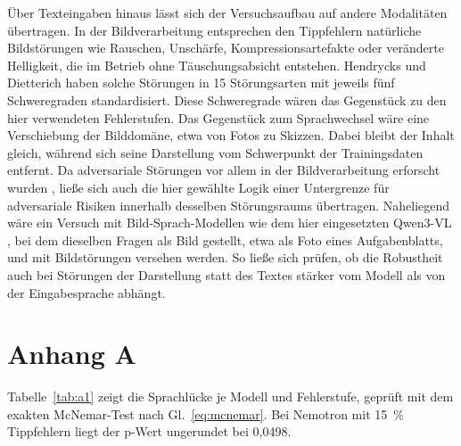 \documentclass[a4paper,titlepage]{article}
\numberwithin{equation}{section} %
\begin{document}
Über Texteingaben hinaus lässt sich der Versuchsaufbau auf andere Modalitäten übertragen. In der Bildverarbeitung entsprechen den Tippfehlern natürliche Bildstörungen wie Rauschen, Unschärfe, Kompressionsartefakte oder veränderte Helligkeit, die im Betrieb ohne Täuschungsabsicht entstehen. Hendrycks und Dietterich \citeyearpar{hendrycks_benchmarking_2019} haben solche Störungen in 15 Störungsarten mit jeweils fünf Schweregraden standardisiert. Diese Schweregrade wären das Gegenstück zu den hier verwendeten Fehlerstufen. Das Gegenstück zum Sprachwechsel wäre eine Verschiebung der Bilddomäne, etwa von Fotos zu Skizzen. Dabei bleibt der Inhalt gleich, während sich seine Darstellung vom Schwerpunkt der Trainingsdaten entfernt. Da adversariale Störungen vor allem in der Bildverarbeitung erforscht wurden \citep{goodfellow_explaining_2014}, ließe sich auch die hier gewählte Logik einer Untergrenze für adversariale Risiken innerhalb desselben Störungsraums übertragen. Naheliegend wäre ein Versuch mit Bild-Sprach-Modellen wie dem hier eingesetzten Qwen3-VL \citep{bai_qwen3-vl_2025}, bei dem dieselben Fragen als Bild gestellt, etwa als Foto eines Aufgabenblatts, und mit Bildstörungen versehen werden. So ließe sich prüfen, ob die Robustheit auch bei Störungen der Darstellung statt des Textes stärker vom Modell als von der Eingabesprache abhängt.

\newpage


\section*{Anhang A}

\setcounter{table}{0}
\renewcommand{\thetable}{A\arabic{table}}

Tabelle~\ref{tab:a1} zeigt die Sprachlücke je Modell und Fehlerstufe, geprüft mit dem exakten McNemar-Test nach Gl.~\eqref{eq:mcnemar}. Bei Nemotron mit 15~\% Tippfehlern liegt der p-Wert ungerundet bei 0,0498.
\end{document}
